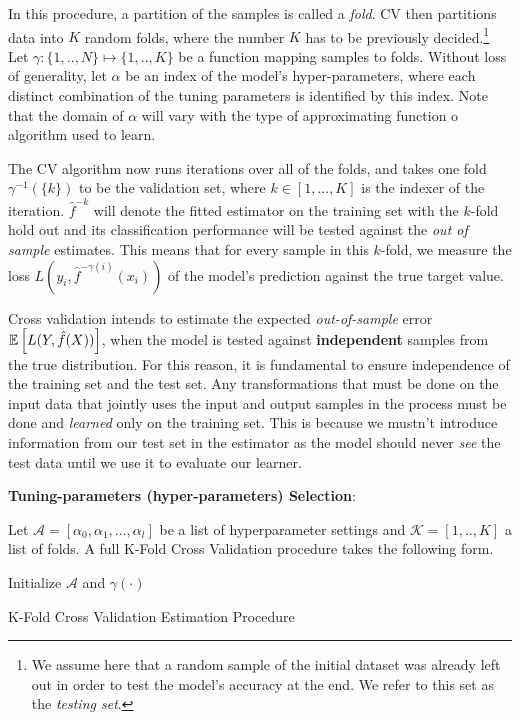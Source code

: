 In this procedure, a partition of the samples is called a \textit{fold}. CV then partitions data into $K$ random folds, where the number $K$ has to be previously decided.\footnote{ We assume here that a random sample of the initial dataset was already left out in order to test the model's accuracy at the end. We refer to this set as the \textit{testing set}.} Let $\gamma : \{1,..,N\} \mapsto \{1, .., K\}$ be a function mapping samples to folds. Without loss of generality,  let $\alpha$ be an index of the model's hyper-parameters, where each distinct combination of the tuning parameters is identified by this index. Note that the domain of $\alpha$ will vary with the type of approximating function o algorithm used to learn.

 The CV algorithm now runs iterations over all of the folds, and takes one fold $\gamma^{-1}(\{k\})$ to be the validation set, where $k \in [1,...,K]$ is the indexer of the iteration. $\hat{f}^{-k}$ will denote the fitted estimator on the training set with the $k$-fold hold out and its classification performance will be tested against the \textit{out of sample} estimates. This means that for every sample in this $k$-fold, we measure the loss $L(y_i, \hat{f}^{-\gamma(i)}(x_i))$ of the model's prediction against the true target value.

Cross validation intends to estimate the expected \textit{out-of-sample} error $\operatorname{\mathbb{E}} \left[  L(Y, \hat{f}(X)) \right]$, when the model is tested against \textbf{independent} samples from the true distribution. For this reason, it is fundamental to ensure independence of the training set and the test set. Any transformations that must be done on the input data that jointly uses the input and output samples in the process must be done and \textit{learned} only on the training set. This is because we mustn't introduce information from our test set in the estimator as the model should never \textit{see} the test data until we use it to evaluate our learner.

\textbf{Tuning-parameters (hyper-parameters) Selection}:

 Let $\mathcal{A} = [\alpha_0, \alpha_1,..., \alpha_l   ]$ be a list of hyperparameter settings and  $\mathcal{K} =[1,..,K]$ a list of folds.  A full K-Fold Cross Validation procedure takes the following form.

  \begin{algorithm}%
  \SetAlgoLined
  Initialize $\mathcal{A}$ and $\gamma(\cdot)$\;
  \caption{K-Fold Cross Validation Estimation Procedure}
 \end{algorithm}

